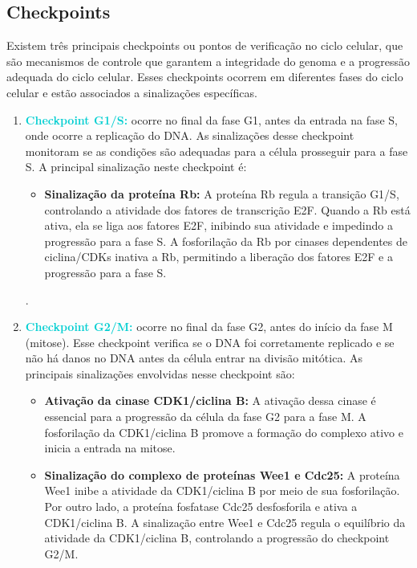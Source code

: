 \documentclass[11pt,a4paper]{article}
\begin{document}
	\subsection{Checkpoints}

	Existem três principais checkpoints ou pontos de verificação no ciclo celular, que são mecanismos de controle que garantem a integridade do genoma e a progressão adequada do ciclo celular. Esses checkpoints ocorrem em diferentes fases do ciclo celular e estão associados a sinalizações específicas.

	\begin{enumerate}
		\item \textcolor{DarkTurquoise}{\textbf{Checkpoint G1/S:}} ocorre no final da fase G1, antes da entrada na fase S, onde ocorre a replicação do DNA. As sinalizações desse checkpoint monitoram se as condições são adequadas para a célula prosseguir para a fase S. A principal sinalização neste checkpoint é:
			\begin{itemize}
				\item \textbf{Sinalização da proteína Rb:} A proteína Rb regula a transição G1/S, controlando a atividade dos fatores de transcrição E2F. Quando a Rb está ativa, ela se liga aos fatores E2F, inibindo sua atividade e impedindo a progressão para a fase S. A fosforilação da Rb por cinases dependentes de ciclina/CDKs inativa a Rb, permitindo a liberação dos fatores E2F e a progressão para a fase S.
			\end{itemize}.
		\item \textcolor{DarkTurquoise}{\textbf{Checkpoint G2/M:}} ocorre no final da fase G2, antes do início da fase M (mitose). Esse checkpoint verifica se o DNA foi corretamente replicado e se não há danos no DNA antes da célula entrar na divisão mitótica. As principais sinalizações envolvidas nesse checkpoint são:
			\begin{itemize}[label=\textcolor{CarnationPink}{$\star$}]
				\item \textbf{Ativação da cinase CDK1/ciclina B:} A ativação dessa cinase é essencial para a progressão da célula da fase G2 para a fase M. A fosforilação da CDK1/ciclina B promove a formação do complexo ativo e inicia a entrada na mitose.
				\item \textbf{Sinalização do complexo de proteínas Wee1 e Cdc25:} A proteína Wee1 inibe a atividade da CDK1/ciclina B por meio de sua fosforilação. Por outro lado, a proteína fosfatase Cdc25 desfosforila e ativa a CDK1/ciclina B. A sinalização entre Wee1 e Cdc25 regula o equilíbrio da atividade da CDK1/ciclina B, controlando a progressão do checkpoint G2/M.

\end{itemize}
\end{enumerate}
\end{document}
